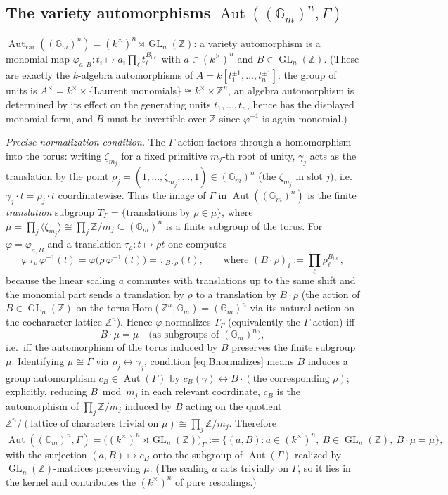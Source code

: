\documentclass{amsart}
\theoremstyle{definition}
\DeclareMathOperator{\Aut}{Aut}
\DeclareMathOperator{\GL}{GL}
\newcommand{\Gm}{\mathbb{G}_m}
\newcommand{\Z}{\mathbb{Z}}
\begin{document}
\subsection{The variety automorphisms $\Aut((\Gm)^n,\Gamma)$}
$\Aut_{\mathrm{var}}((\Gm)^n)=(k^\times)^n\rtimes\GL_n(\Z)$:
a variety automorphism is a monomial map
$\varphi_{a,B}\colon t_i\mapsto a_i\prod_\ell t_\ell^{B_{i\ell}}$ with
$a\in(k^\times)^n$ and $B\in\GL_n(\Z)$.  (These are exactly the $k$-algebra
automorphisms of $A=k[t_1^{\pm1},\dots,t_n^{\pm1}]$: the group of units is
$A^\times=k^\times\times\{$Laurent monomials$\}\cong k^\times\times\Z^n$, an
algebra automorphism is determined by its effect on the generating units
$t_1,\dots,t_n$, hence has the displayed monomial form, and $B$ must be
invertible over $\Z$ since $\varphi^{-1}$ is again monomial.)

\emph{Precise normalization condition.}  The $\Gamma$-action factors through
a homomorphism into the torus: writing $\zeta_{m_j}$ for a fixed primitive
$m_j$-th root of unity, $\gamma_j$ acts as the translation by the point
$\rho_j=(1,\dots,\zeta_{m_j},\dots,1)\in(\Gm)^n$ (the $\zeta_{m_j}$ in slot
$j$), i.e.\ $\gamma_j\cdot t=\rho_j\!\cdot\!t$ coordinatewise.  Thus the
image of $\Gamma$ in $\Aut((\Gm)^n)$ is the finite \emph{translation}
subgroup $T_\Gamma=\{$translations by $\rho\in\mu\}$, where
$\mu=\prod_j\langle\zeta_{m_j}\rangle\cong\prod_j\Z/m_j\subseteq(\Gm)^n$ is
a finite subgroup of the torus.  For $\varphi=\varphi_{a,B}$ and a
translation $\tau_\rho\colon t\mapsto\rho t$ one computes
\[
\varphi\,\tau_\rho\,\varphi^{-1}(t)
=\varphi\bigl(\rho\,\varphi^{-1}(t)\bigr)
=\tau_{\,B\!\cdot\!\rho}(t),
\qquad\text{where }(B\!\cdot\!\rho)_i:=\prod_\ell\rho_\ell^{B_{i\ell}},
\]
because the linear scaling $a$ commutes with translations up to the same
shift and the monomial part sends a translation by $\rho$ to a translation
by $B\!\cdot\!\rho$ (the action of $B\in\GL_n(\Z)$ on the torus
$\mathrm{Hom}(\Z^n,\Gm)=(\Gm)^n$ via its natural action on the cocharacter
lattice $\Z^n$).  Hence $\varphi$ normalizes $T_\Gamma$ (equivalently the
$\Gamma$-action) iff
\begin{equation}\label{eq:Bnormalizes}
B\cdot\mu=\mu\quad\text{(as subgroups of }(\Gm)^n),
\end{equation}
i.e.\ iff the automorphism of the torus induced by $B$ preserves the finite
subgroup $\mu$.  Identifying $\mu\cong\Gamma$ via $\rho_j\leftrightarrow
\gamma_j$, condition \eqref{eq:Bnormalizes} means $B$ induces a group
automorphism $c_B\in\Aut(\Gamma)$ by $c_B(\gamma)\leftrightarrow B\!\cdot\!
(\text{the corresponding }\rho)$; explicitly, reducing $B\bmod m_j$ in each
relevant coordinate, $c_B$ is the automorphism of $\prod_j\Z/m_j$ induced by
$B$ acting on the quotient $\Z^n/(\text{lattice of characters trivial on }
\mu)\cong\prod_j\Z/m_j$.  Therefore
\[
\Aut((\Gm)^n,\Gamma)=
\bigl((k^\times)^n\rtimes\GL_n(\Z)\bigr)_{\Gamma}
:=\{(a,B):a\in(k^\times)^n,\ B\in\GL_n(\Z),\ B\cdot\mu=\mu\},
\]
with the surjection $(a,B)\mapsto c_B$ onto the subgroup of $\Aut(\Gamma)$
realized by $\GL_n(\Z)$-matrices preserving $\mu$.  (The scaling $a$ acts
trivially on $\Gamma$, so it lies in the kernel and contributes the
$(k^\times)^n$ of pure rescalings.)
\end{document}
